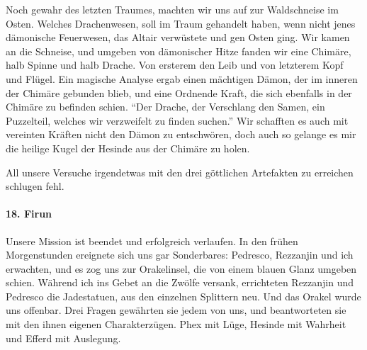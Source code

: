 Noch gewahr des letzten Traumes, machten wir uns auf zur Waldschneise im Osten. Welches Drachenwesen, soll im Traum gehandelt haben, wenn nicht jenes dämonische Feuerwesen, das Altair verwüstete und gen Osten ging. Wir kamen an die Schneise, und umgeben von dämonischer Hitze fanden wir eine Chimäre, halb Spinne und halb Drache. Von ersterem den Leib und von letzterem Kopf und Flügel. Ein magische Analyse ergab einen mächtigen Dämon, der im inneren der Chimäre gebunden blieb, und eine Ordnende Kraft, die sich ebenfalls in der Chimäre zu befinden schien. ``Der Drache, der Verschlang den Samen, ein Puzzelteil, welches wir verzweifelt zu finden suchen.'' Wir schafften es auch mit vereinten Kräften nicht den Dämon zu entschwören, doch auch so gelange es mir die heilige Kugel der Hesinde aus der Chimäre zu holen.

All unsere Versuche irgendetwas mit den drei göttlichen Artefakten zu erreichen schlugen fehl.

\paragraph{18. Firun}
Unsere Mission ist beendet und erfolgreich verlaufen. In den frühen Morgenstunden ereignete sich uns gar Sonderbares: Pedresco, Rezzanjin und ich erwachten, und es zog uns zur Orakelinsel, die von einem blauen Glanz umgeben schien. Während ich ins Gebet an die Zwölfe versank, errichteten Rezzanjin und Pedresco die Jadestatuen, aus den einzelnen Splittern neu. Und das Orakel wurde uns offenbar. Drei Fragen gewährten sie jedem von uns, und beantworteten sie mit den ihnen eigenen Charakterzügen. Phex mit Lüge, Hesinde mit Wahrheit und Efferd mit Auslegung.

